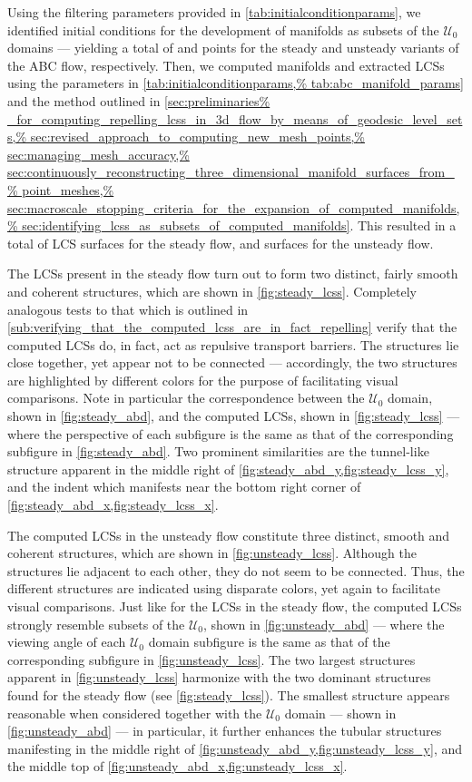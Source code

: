 Using the filtering parameters provided in \cref{tab:initialconditionparams},
we identified initial conditions for the development of manifolds as subsets
of the $\mathcal{U}_{0}$ domains --- yielding a total of  and
 points for the steady and unsteady variants of the ABC flow,
respectively. Then, we computed manifolds and extracted LCSs using the
parameters in \cref{tab:initialconditionparams,%
tab:abc_manifold_params} and the method outlined in \cref{sec:preliminaries%
_for_computing_repelling_lcss_in_3d_flow_by_means_of_geodesic_level_sets,%
    sec:revised_approach_to_computing_new_mesh_points,%
    sec:managing_mesh_accuracy,%
    sec:continuously_reconstructing_three_dimensional_manifold_surfaces_from_%
    point_meshes,%
    sec:macroscale_stopping_criteria_for_the_expansion_of_computed_manifolds,%
    sec:identifying_lcss_as_subsets_of_computed_manifolds}. This resulted
in a total of  LCS surfaces for the steady flow, and
 surfaces for the unsteady flow.
\clearpage

The LCSs present in the steady flow turn out to form two distinct, fairly
smooth and coherent structures, which are shown in \cref{fig:steady_lcss}.
Completely analogous tests to that which is outlined in
\cref{sub:verifying_that_the_computed_lcss_are_in_fact_repelling} verify that
the computed LCSs do, in fact, act as repulsive transport barriers. The
structures lie close together, yet appear not to be connected --- accordingly,
the two structures are highlighted by different colors for the purpose of
facilitating visual comparisons. Note in particular the correspondence between
the $\mathcal{U}_{0}$  domain, shown in \cref{fig:steady_abd}, and the computed
LCSs, shown in \cref{fig:steady_lcss} --- where the perspective of each
subfigure is the same as that of the corresponding subfigure in
\cref{fig:steady_abd}. Two prominent similarities are the tunnel-like structure
apparent in the middle right of \cref{fig:steady_abd_y,fig:steady_lcss_y}, and
the indent which manifests near the bottom right corner of
\cref{fig:steady_abd_x,fig:steady_lcss_x}.

The computed LCSs in the unsteady flow constitute three distinct, smooth and
coherent structures, which are shown in \cref{fig:unsteady_lcss}. Although
the structures lie adjacent to each other, they do not seem to be connected.
Thus, the different structures are indicated using disparate colors, yet
again to facilitate visual comparisons. Just like for the LCSs in the steady
flow, the computed LCSs strongly resemble subsets of the $\mathcal{U}_{0}$,
shown in \cref{fig:unsteady_abd} --- where the viewing angle of each
$\mathcal{U}_{0}$ domain subfigure is the same as that of the corresponding
subfigure in \cref{fig:unsteady_lcss}. The two largest structures apparent in
\cref{fig:unsteady_lcss} harmonize with the two dominant structures found for
the steady flow (see \cref{fig:steady_lcss}). The smallest structure appears
reasonable when considered together with the $\mathcal{U}_{0}$ domain --- shown
in \cref{fig:unsteady_abd} --- in particular, it further enhances the
tubular structures manifesting in the middle right of
\cref{fig:unsteady_abd_y,fig:unsteady_lcss_y}, and the middle top of
\cref{fig:unsteady_abd_x,fig:unsteady_lcss_x}.





